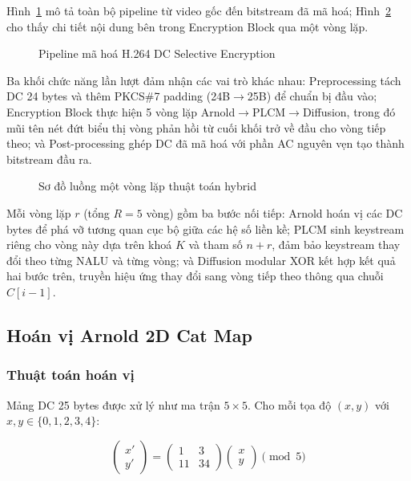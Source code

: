 Hình~\ref{fig:pipeline_encrypt} mô tả toàn bộ pipeline từ video gốc đến bitstream đã mã hoá; Hình~\ref{fig:hybrid_flowchart} cho thấy chi tiết nội dung bên trong Encryption Block qua một vòng lặp.

\begin{figure}[ht]
\centering

\caption{Pipeline mã hoá H.264 DC Selective Encryption}
\label{fig:pipeline_encrypt}
\end{figure}

Ba khối chức năng lần lượt đảm nhận các vai trò khác nhau: Preprocessing tách DC 24 bytes và thêm PKCS\#7 padding (24B$\to$25B) để chuẩn bị đầu vào; Encryption Block thực hiện 5 vòng lặp Arnold$\to$PLCM$\to$Diffusion, trong đó mũi tên nét đứt biểu thị vòng phản hồi từ cuối khối trở về đầu cho vòng tiếp theo; và Post-processing ghép DC đã mã hoá với phần AC nguyên vẹn tạo thành bitstream đầu ra.

\begin{figure}[ht]
\centering

\caption{Sơ đồ luồng một vòng lặp thuật toán hybrid}
\label{fig:hybrid_flowchart}
\end{figure}

Mỗi vòng lặp $r$ (tổng $R=5$ vòng) gồm ba bước nối tiếp: Arnold hoán vị các DC bytes để phá vỡ tương quan cục bộ giữa các hệ số liền kề; PLCM sinh keystream riêng cho vòng này dựa trên khoá $K$ và tham số $n{+}r$, đảm bảo keystream thay đổi theo từng NALU và từng vòng; và Diffusion modular XOR kết hợp kết quả hai bước trên, truyền hiệu ứng thay đổi sang vòng tiếp theo thông qua chuỗi $C[i-1]$.

\subsection{Hoán vị Arnold 2D Cat Map}

\subsubsection{Thuật toán hoán vị}

Mảng DC 25 bytes được xử lý như ma trận $5 \times 5$. Cho mỗi tọa độ $(x, y)$ với $x, y \in \{0, 1, 2, 3, 4\}$:

\begin{equation}
\begin{pmatrix} x' \\ y' \end{pmatrix}
= \begin{pmatrix} 1 & 3 \\ 11 & 34 \end{pmatrix}
\begin{pmatrix} x \\ y \end{pmatrix} \pmod{5}
\end{equation}

